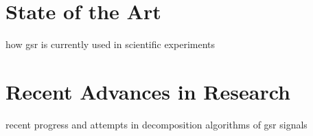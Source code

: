 



\section{State of the Art}
how gsr is currently used in scientific experiments

\newpage

\section{Recent Advances in Research}

recent progress and attempts in decomposition algorithms of gsr signals